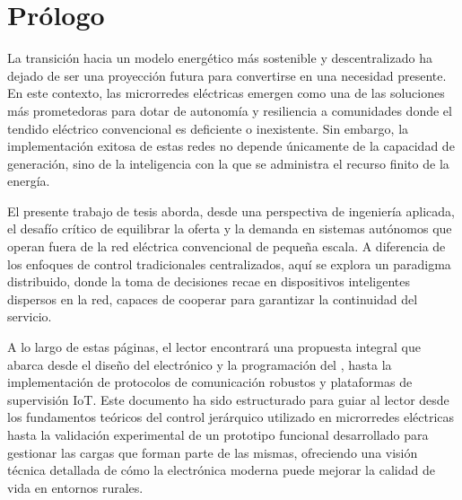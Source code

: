 \cleardoublepage
\chapter*{Prólogo}

La transición hacia un modelo energético más sostenible y descentralizado ha dejado de ser una proyección futura para convertirse en una necesidad presente. En este contexto, las microrredes eléctricas emergen como una de las soluciones más prometedoras para dotar de autonomía y resiliencia a comunidades donde el tendido eléctrico convencional es deficiente o inexistente. Sin embargo, la implementación exitosa de estas redes no depende únicamente de la capacidad de generación, sino de la inteligencia con la que se administra el recurso finito de la energía.

El presente trabajo de tesis aborda, desde una perspectiva de ingeniería aplicada, el desafío crítico de equilibrar la oferta y la demanda en sistemas autónomos que operan fuera de la red eléctrica convencional de pequeña escala. A diferencia de los enfoques de control tradicionales centralizados, aquí se explora un paradigma distribuido, donde la toma de decisiones recae en dispositivos inteligentes dispersos en la red, capaces de cooperar para garantizar la continuidad del servicio.

A lo largo de estas páginas, el lector encontrará una propuesta integral que abarca desde el diseño del  electrónico y la programación del , hasta la implementación de protocolos de comunicación robustos y plataformas de supervisión IoT. Este documento ha sido estructurado para guiar al lector desde los fundamentos teóricos del control jerárquico utilizado en microrredes eléctricas hasta la validación experimental de un prototipo funcional desarrollado para gestionar las cargas que forman parte de las mismas, ofreciendo una visión técnica detallada de cómo la electrónica moderna puede mejorar la calidad de vida en entornos rurales.
